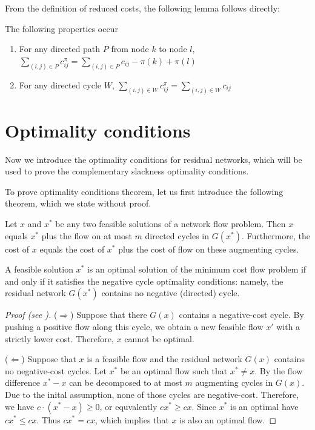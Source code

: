 From the definition of reduced costs, the following lemma follows directly:
\begin{lemma}
\label{reducedproperties2}
The following properties occur
\begin{enumerate}
    \item For any directed path $P$ from node $k$ to node $l$, $\sum_{(i,j)\in P} c_{ij}^\pi = \sum_{(i,j)\in P} c_{ij} - \pi(k) + \pi(l)$
    \item For any directed cycle $W$, $\sum_{(i,j)\in W} c_{ij}^\pi = \sum_{(i,j)\in W} c_{ij}$
\end{enumerate}
\end{lemma}

\section{Optimality conditions}\label{sec:optimality_conditions_flow}
Now we introduce the optimality conditions for residual networks, which will be used to prove the complementary slackness optimality conditions.

To prove optimality conditions theorem, let us first introduce the following theorem, which we state without proof.
\begin{theorem}
\label{thm:augmenting_cycle}
Let $x$ and $x^*$ be any two feasible solutions of a network flow problem. Then $x$ equals $x^*$ plus the flow on at most $m$ directed cycles in $G(x^*)$. Furthermore, the cost of $x$ equals the cost of $x^*$ plus the cost of flow on these augmenting cycles.
\end{theorem}


\begin{theorem}
\label{optimality1}
A feasible solution $x^*$ is an optimal solution of the minimum cost flow problem if and only if it satisfies the negative cycle optimality conditions: namely, the residual network $G(x^*)$ contains no negative (directed) cycle.
\end{theorem}

\begin{proof}[Proof (see {\cite[p.~307]{ahuja1993network}})]

($\Rightarrow$) Suppose that there $G(x)$ contains a negative-cost cycle. By pushing a positive flow along this cycle, we obtain a new feasible flow $x'$ with a strictly lower cost. Therefore, $x$ cannot be optimal. 

($\Leftarrow$) Suppose that $x$ is a feasible flow and the residual network $G(x)$ contains no negative-cost cycles. Let $x^*$ be an optimal flow such that $x^* \neq x$. By  the flow difference $x^*-x$ can be decomposed to at most $m$ augmenting cycles in $G(x)$. Due to the inital assumption, none of those cycles are negative-cost. Therefore, we have $c \cdot (x^* - x) \geq 0$, or equvalently $cx^* \geq cx$. Since $x^*$ is an optimal have $cx^* \leq cx$. Thus $cx^*= cx$, which implies that $x$ is also an optimal flow. 

\end{proof}


